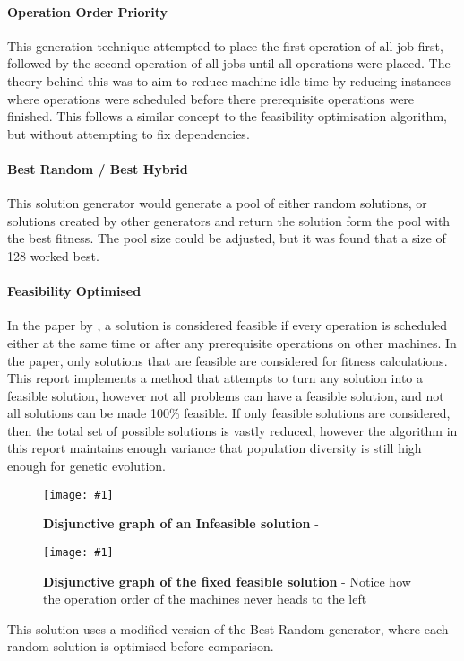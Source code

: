 \documentclass[14pt]{acmsiggraph}
\newcommand{\figuremacroW}[4]{
	\begin{figure}[h] %
		\centering
		\texttt{[image: \#1]}
		\caption[#2]{\textbf{#2} - #3}
		\label{fig:#1}
	\end{figure}
}
\begin{document}
	\paragraph{Operation Order Priority}
	This generation technique attempted to place the first operation of all job first, followed by the second operation of all jobs until all operations were placed. The theory behind this was to aim to reduce machine idle time by reducing instances where operations were scheduled before there prerequisite operations were finished. This follows a similar concept to the feasibility optimisation algorithm, but without attempting to fix dependencies.
	
	\paragraph{Best Random / Best Hybrid}
	This solution generator would generate a pool of either random solutions, or solutions created by other generators and return the solution form the pool with the best fitness. The pool size could be adjusted, but it was found that a size of 128 worked best.
	
	\paragraph{Feasibility Optimised}
	In the paper by \cite{wang2012new}, a solution is considered feasible if every operation is scheduled either at the same time or after any prerequisite operations on other machines. In the paper, only solutions that are feasible are considered for fitness calculations. This report implements a method that attempts to turn any solution into a feasible solution, however not all problems can have a feasible solution, and not all solutions can be made 100\% feasible. If only feasible solutions are considered, then the total set of possible solutions is vastly reduced, however the algorithm in this report maintains enough variance that population diversity is still high enough for genetic evolution. 
	
	\figuremacroW
	{infeasible}
	{Disjunctive graph of an Infeasible solution}
	{\cite{wang2012new}}
	{1.0}
	\figuremacroW
	{good}
	{Disjunctive graph of the fixed feasible solution}
	{Notice how the operation order of the machines never heads to the left\cite{wang2012new}}
	{1.0}
	
	This solution uses a modified version of the Best Random generator, where each random solution is optimised before comparison.
	
\end{document}
